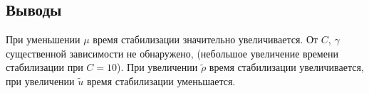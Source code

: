 \subsection{Выводы}
При уменьшении $\mu$ время стабилизации значительно увеличивается. От $C$, $\gamma$ существенной зависимости не обнаружено, (небольшое увеличение времени стабилизации при $C=10$). При увеличении $\tilde{\rho}$ время стабилизации увеличивается, при увеличении $\tilde{u}$ время стабилизации уменьшается.

